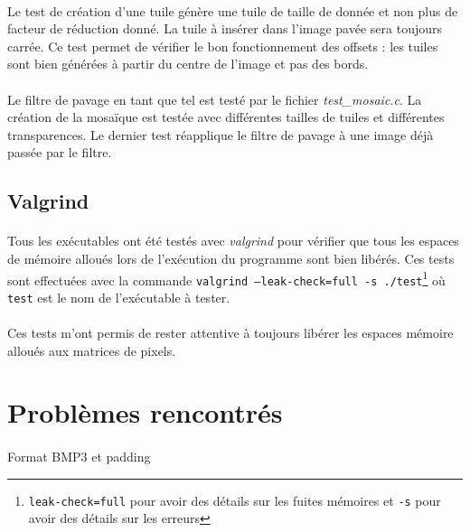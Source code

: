 \documentclass{article}
\begin{document}
    \paragraph{}
    Le test de création d'une tuile génère une tuile de taille de donnée et non plus de facteur de réduction donné. La tuile à insérer dans l'image pavée sera toujours carrée. Ce test permet de vérifier le bon fonctionnement des offsets : les tuiles sont bien générées à partir du centre de l'image et pas des bords.

    \paragraph{}
    Le filtre de pavage en tant que tel est testé par le fichier \emph{test\_mosaic.c}. La création de la mosaïque est testée avec différentes tailles de tuiles et différentes transparences. Le dernier test réapplique le filtre de pavage à une image déjà passée par le filtre.



    \subsection{Valgrind}
    \paragraph{}
    Tous les exécutables ont été testés avec \emph{valgrind} pour vérifier que tous les espaces de mémoire alloués lors de l'exécution du programme sont bien libérés. Ces tests sont effectuées avec la commande \texttt{valgrind --leak-check=full -s ./test}\footnote{\texttt{leak-check=full} pour avoir des détails sur les fuites mémoires et \texttt{-s} pour avoir des détails sur les erreurs} où \texttt{test} est le nom de l'exécutable à tester.

    \paragraph{}
    Ces tests m'ont permis de rester attentive à toujours libérer les espaces mémoire alloués aux matrices de pixels.



    \newpage
    \section{Problèmes rencontrés}
    \paragraph{}
    Format BMP3 et padding

    
\end{document}
